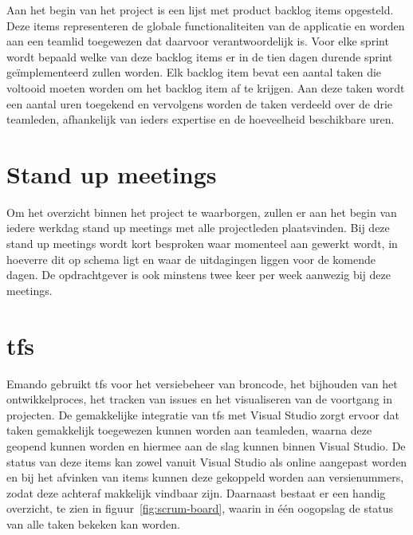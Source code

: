 Aan het begin van het project is een lijst met product backlog items opgesteld. Deze items representeren de globale functionaliteiten van de applicatie en worden aan een teamlid toegewezen dat daarvoor verantwoordelijk is. Voor elke sprint wordt bepaald welke van deze backlog items er in de tien dagen durende sprint geïmplementeerd zullen worden. Elk backlog item bevat een aantal taken die voltooid moeten worden om het backlog item af te krijgen. Aan deze taken wordt een aantal uren toegekend en vervolgens worden de taken verdeeld over de drie teamleden, afhankelijk van ieders expertise en de hoeveelheid beschikbare uren.

\section{Stand up meetings}
Om het overzicht binnen het project te waarborgen, zullen er aan het begin van iedere werkdag stand up meetings met alle projectleden plaatsvinden. Bij deze stand up meetings wordt kort besproken waar momenteel aan gewerkt wordt, in hoeverre dit op schema ligt en waar de uitdagingen liggen voor de komende dagen. De opdrachtgever is ook minstens twee keer per week aanwezig bij deze meetings.

\section{\acl{tfs}}
Emando gebruikt \ac{tfs} voor het versiebeheer van broncode, het bijhouden van het ontwikkelproces, het tracken van issues en het visualiseren van de voortgang in projecten. De gemakkelijke integratie van \ac{tfs} met Visual Studio zorgt ervoor dat taken gemakkelijk toegewezen kunnen worden aan teamleden, waarna deze geopend kunnen worden en hiermee aan de slag kunnen binnen Visual Studio. De status van deze items kan zowel vanuit Visual Studio als online aangepast worden en bij het afvinken van items kunnen deze gekoppeld worden aan versienummers, zodat deze achteraf makkelijk vindbaar zijn. Daarnaast bestaat er een handig overzicht, te zien in figuur~\ref{fig:scrum-board}, waarin in één oogopslag de status van alle taken bekeken kan worden.

